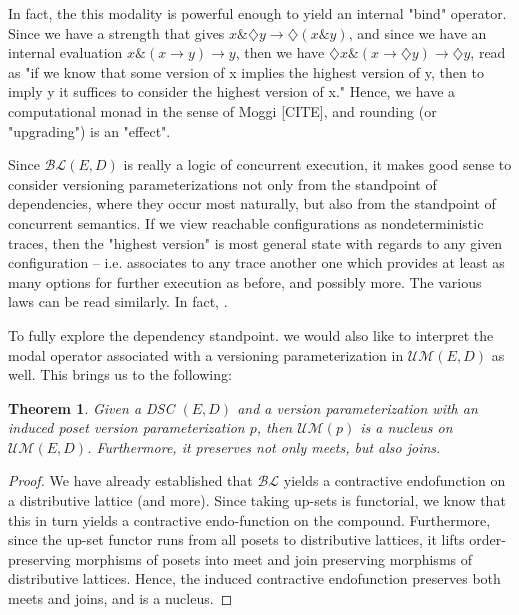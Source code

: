 \documentclass[hoptionsi,review,format=acmsmall]{acmart}
\newtheorem{theorem}{Theorem}[section]
\theoremstyle{definition}
\newcommand{\UMc}{\mathcal{UM}}
\newcommand{\BLc}{\mathcal{BL}}
\newcommand{\band}{\mathbin{\&}}
\newcommand{\Dia}{\diamondsuit}
\begin{document}
In fact, the this modality is powerful enough to yield an internal "bind" operator. Since we have a strength that gives \(x \band \Dia{y} \rightarrow \Dia(x \band y)\), and since we have an internal evaluation \(x \band (x \rightarrow y) \rightarrow y\), then we have \(\Dia{x} \band (x \rightarrow \Dia{y}) \rightarrow \Dia{y}\), read as "if we know that some version of x implies the highest version of y, then to imply y it suffices to consider the highest version of x." Hence, we have a computational monad in the sense of Moggi [CITE], and rounding (or "upgrading") is an "effect".


Since \(\BLc(E,D)\) is really a logic of concurrent execution, it makes good sense to consider versioning parameterizations not only from the standpoint of dependencies, where they occur most naturally, but also from the standpoint of concurrent semantics. If we view reachable configurations as nondeterministic traces, then the "highest version" is most general state with regards to any given configuration -- i.e. associates to any trace another one which provides at least as many options for further execution as before, and possibly more. The various laws can be read similarly. In fact, .

To fully explore the dependency standpoint. we would also like to interpret the modal operator associated with a versioning parameterization in \(\UMc(E,D)\) as well. This brings us to the following:

\begin{theorem}
Given a DSC \((E,D)\) and a version parameterization with an induced poset version parameterization \(p\), then \(\UMc(p)\) is a nucleus on \(\UMc(E,D)\). Furthermore, it preserves not only meets, but also joins.
\end{theorem}
\begin{proof}
We have already established that \(\BLc\) yields a contractive endofunction on a distributive lattice (and more). Since taking up-sets is functorial, we know that this in turn yields a contractive endo-function on the compound. Furthermore, since the up-set functor runs from all posets to distributive lattices, it lifts order-preserving morphisms of posets into meet and join preserving morphisms of distributive lattices. Hence, the induced contractive endofunction preserves both meets and joins, and is a nucleus.
\end{proof}
\end{document}
